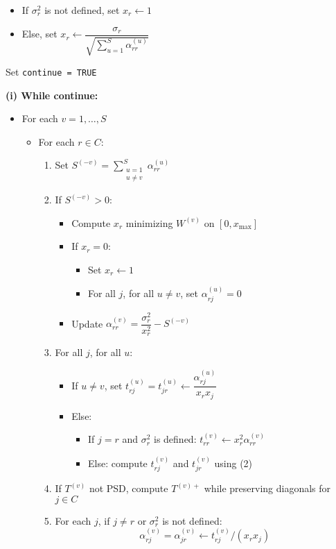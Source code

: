 \documentclass[11pt]{article}
\begin{document}
\begin{itemize}
  \item If $\sigma_r^2$ is not defined, set $x_r \leftarrow 1$
  \item Else, set $x_r \leftarrow \dfrac{\sigma_r}{\sqrt{\sum_{u=1}^S \alpha_{rr}^{(u)}}}$
\end{itemize}

Set \texttt{continue = TRUE}

\textbf{(i) While continue:}

\begin{itemize}
  \item For each $v = 1, \ldots, S$
  \begin{itemize}
    \item For each $r \in C$:
    \begin{enumerate}
      \item Set $S^{(-v)} = \sum_{\substack{u=1\\u \ne v}}^S \alpha_{rr}^{(u)}$
      \item If $S^{(-v)} > 0$:
      \begin{itemize}
        \item Compute $x_r$ minimizing $W^{(v)}$ on $[0, x_{\max}]$
        \item If $x_r = 0$:
        \begin{itemize}
          \item Set $x_r \leftarrow 1$
          \item For all $j$, for all $u \ne v$, set $\alpha_{rj}^{(u)} = 0$
        \end{itemize}
        \item Update $\alpha_{rr}^{(v)} = \dfrac{\sigma_r^2}{x_r^2} - S^{(-v)}$
      \end{itemize}
      \item For all $j$, for all $u$:
      \begin{itemize}
        \item If $u \ne v$, set $t_{rj}^{(u)} = t_{jr}^{(u)} \leftarrow \dfrac{\alpha_{rj}^{(u)}}{x_r x_j}$
        \item Else:
        \begin{itemize}
          \item If $j = r$ and $\sigma_r^2$ is defined: $t_{rr}^{(v)} \leftarrow x_r^2 \alpha_{rr}^{(v)}$
          \item Else: compute $t_{rj}^{(v)}$ and $t_{jr}^{(v)}$ using (2)
        \end{itemize}
      \end{itemize}
      \item If $T^{(v)}$ not PSD, compute $T^{(v)+}$ while preserving diagonals for $j \in C$
      \item For each $j$, if $j \ne r$ or $\sigma_r^2$ is not defined:
      \[
      \alpha_{rj}^{(v)} = \alpha_{jr}^{(v)} \leftarrow t_{rj}^{(v)} / (x_r x_j)
      \]
    \end{enumerate}
  \end{itemize}
\end{itemize}
\end{document}
